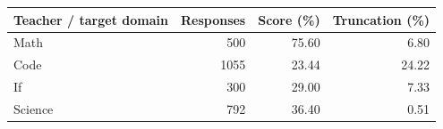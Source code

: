 \begin{tabular}{lrrr}
\toprule
Teacher / target domain & Responses & Score (\%) & Truncation (\%) \\
\midrule
Math & 500 & 75.60 & 6.80 \\
Code & 1055 & 23.44 & 24.22 \\
If & 300 & 29.00 & 7.33 \\
Science & 792 & 36.40 & 0.51 \\
\bottomrule
\end{tabular}
